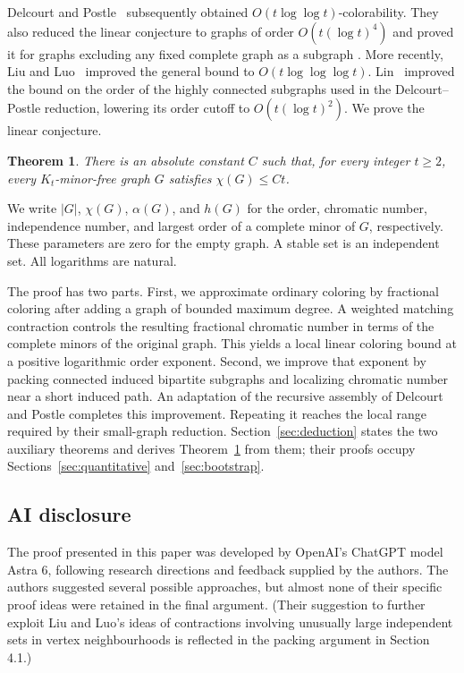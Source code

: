 \documentclass[11pt]{article}
\newtheorem{theorem}{Theorem}
\begin{document}
Delcourt and Postle~\cite[Theorem~1.5]{DP} subsequently obtained
$O(t\log\log t)$-colorability. They also reduced the linear conjecture
to graphs of order $O(t(\log t)^4)$ and proved it for graphs excluding
any fixed complete graph as a subgraph
\cite[Theorem~1.6 and Corollaries~1.7--1.10]{DP}.
More recently, Liu and Luo~\cite[Theorem~1.1]{LL} improved the general
bound to $O(t\log\log\log t)$. Lin~\cite[Theorem~1.4 and p.~3]{Lin}
improved the bound on the order of the highly connected subgraphs
used in the Delcourt--Postle reduction, lowering its order cutoff to
$O(t(\log t)^2)$. We prove the linear conjecture.

\begin{theorem}\label{thm:linear}
There is an absolute constant $C$ such that, for every integer $t\ge2$,
every $K_t$-minor-free graph $G$ satisfies $\chi(G)\le Ct$.
\end{theorem}

We write $|G|$, $\chi(G)$,
$\alpha(G)$, and $h(G)$ for the order, chromatic number, independence
number, and largest order of a complete minor of $G$, respectively.
These parameters are zero for the empty graph. A stable set is an
independent set. All logarithms are natural.

The proof has two parts. First, we approximate ordinary coloring by
fractional coloring after adding a graph of bounded maximum degree.
A weighted matching contraction controls the resulting fractional
chromatic number in terms of the complete minors of the original
graph. This yields a local linear coloring bound at a positive
logarithmic order exponent. Second, we improve that exponent by
packing connected induced bipartite subgraphs and localizing chromatic
number near a short induced path. An adaptation of the recursive
assembly of Delcourt and Postle completes this improvement. Repeating
it reaches the local range required by their small-graph reduction.
Section~\ref{sec:deduction} states the two auxiliary theorems and
derives Theorem~\ref{thm:linear} from them; their proofs occupy
Sections~\ref{sec:quantitative} and~\ref{sec:bootstrap}.

\subsection*{AI disclosure}

The proof presented in this paper was developed by OpenAI’s ChatGPT model Astra 6, following research directions and feedback supplied by the authors. The authors suggested several possible approaches, but almost none of their specific proof ideas were retained in the final argument. (Their suggestion to further exploit Liu and Luo’s  ideas of contractions involving unusually large independent sets in vertex neighbourhoods is reflected in the packing argument in Section 4.1.)
\end{document}

